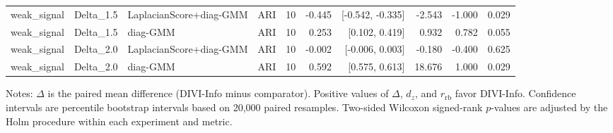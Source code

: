 \begin{table}[t]
\begin{tabular}{lllrrrrrr}
weak\_signal & Delta\_1.5 & LaplacianScore+diag-GMM & ARI & 10 & -0.445 & [-0.542, -0.335] & -2.543 & -1.000 & 0.029 \\
weak\_signal & Delta\_1.5 & diag-GMM & ARI & 10 & 0.253 & [0.102, 0.419] & 0.932 & 0.782 & 0.055 \\
weak\_signal & Delta\_2.0 & LaplacianScore+diag-GMM & ARI & 10 & -0.002 & [-0.006, 0.003] & -0.180 & -0.400 & 0.625 \\
weak\_signal & Delta\_2.0 & diag-GMM & ARI & 10 & 0.592 & [0.575, 0.613] & 18.676 & 1.000 & 0.029 \\
\bottomrule
\end{tabular}
\begin{flushleft}
\footnotesize
Notes: $\Delta$ is the paired mean difference (DIVI-Info minus comparator). Positive values of $\Delta$, $d_z$, and $r_{\mathrm{rb}}$ favor DIVI-Info. Confidence intervals are percentile bootstrap intervals based on 20,000 paired resamples. Two-sided Wilcoxon signed-rank $p$-values are adjusted by the Holm procedure within each experiment and metric.
\end{flushleft}
\end{table}